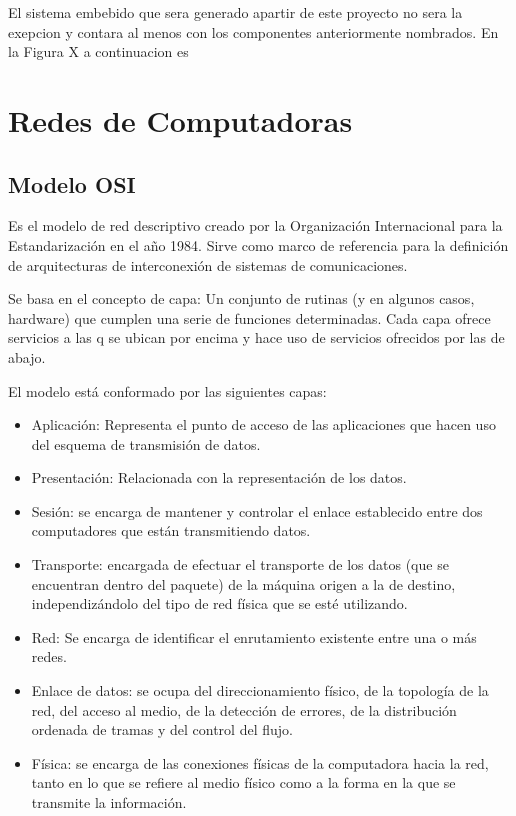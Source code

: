 El sistema embebido que sera generado apartir de este proyecto no sera la exepcion y contara al menos con los componentes anteriormente nombrados. En la Figura X a continuacion es 



\section{Redes de Computadoras}

\subsection{Modelo OSI}

Es el modelo de red descriptivo creado por la Organización Internacional para la Estandarización en el año 1984. Sirve como marco de referencia para la definición de arquitecturas de interconexión de sistemas de comunicaciones.

Se basa en el concepto de capa: Un conjunto de rutinas (y en algunos casos, hardware) que cumplen una serie de funciones determinadas. Cada capa ofrece servicios a las q se ubican por encima y hace uso de servicios ofrecidos por las de abajo.

El modelo está conformado por las siguientes capas:

\begin{itemize}
	\item Aplicación: Representa el punto de acceso de las aplicaciones que hacen uso del esquema de transmisión de datos.
	\item Presentación: Relacionada con la representación de los datos.
	\item Sesión: se encarga de mantener y controlar el enlace establecido entre dos computadores que están transmitiendo datos.
	\item Transporte: encargada de efectuar el transporte de los datos (que se encuentran dentro del paquete) de la máquina origen a la de destino, independizándolo del tipo de red física que se esté utilizando.
	\item Red: Se encarga de identificar el enrutamiento existente entre una o más redes.
	\item Enlace de datos: se ocupa del direccionamiento físico, de la topología de la red, del acceso al medio, de la detección de errores, de la distribución ordenada de tramas y del control del flujo.
	\item Física: se encarga de las conexiones físicas de la computadora hacia la red, tanto en lo que se refiere al medio físico como a la forma en la que se transmite la información.
\end{itemize}

